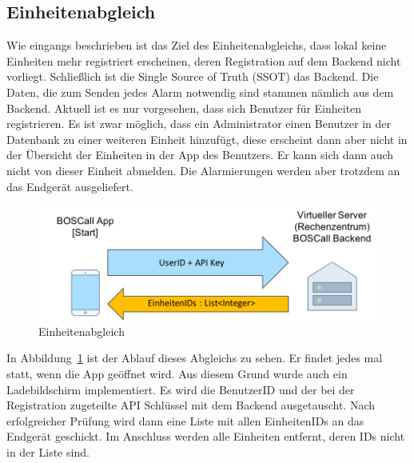 \subsection{Einheitenabgleich}
Wie eingangs beschrieben ist das Ziel des Einheitenabgleichs, dass lokal keine Einheiten mehr registriert erscheinen, deren Registration auf dem Backend nicht vorliegt. Schließlich ist die Single Source of Truth (SSOT) das Backend. Die Daten, die zum Senden jedes Alarm notwendig sind stammen nämlich aus dem Backend. Aktuell ist es nur vorgesehen, dass sich Benutzer für Einheiten registrieren. Es ist zwar möglich, dass ein Administrator einen Benutzer in der Datenbank zu einer weiteren Einheit hinzufügt, diese erscheint dann aber nicht in der Übersicht der Einheiten in der App des Benutzers. Er kann sich dann auch nicht von dieser Einheit abmelden. Die Alarmierungen werden aber trotzdem an das Endgerät ausgeliefert.

\begin{figure}[H]
	\centering
	\includegraphics[width=\linewidth]{include/img/einheitenabgleich}
	\caption{Einheitenabgleich}
	\label{fig:einheitenabgleich}
\end{figure}

In Abbildung~\ref{fig:einheitenabgleich} ist der Ablauf dieses Abgleichs zu sehen. Er findet jedes mal statt, wenn die App geöffnet wird. Aus diesem Grund wurde auch ein Ladebildschirm implementiert. Es wird die BenutzerID und der bei der Registration zugeteilte API Schlüssel mit dem Backend ausgetauscht. Nach erfolgreicher Prüfung wird dann eine Liste mit allen EinheitenIDs an das Endgerät geschickt. Im Anschluss werden alle Einheiten entfernt, deren IDs nicht in der Liste sind.